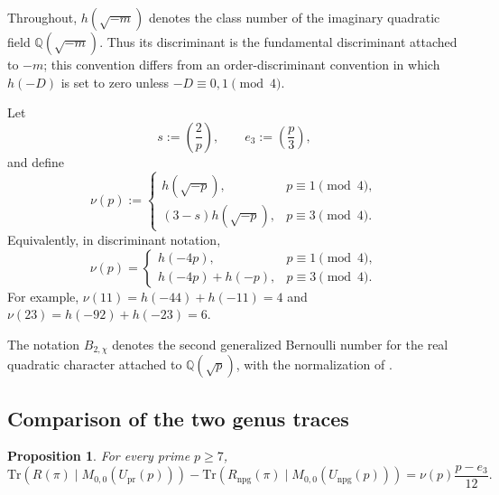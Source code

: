\documentclass[10pt,a4paper]{amsart}
\newtheorem{proposition}[theorem]{Proposition}
\newcommand{\Q}{\mathbb{Q}}
\newcommand{\Tr}{\mathrm{Tr}}
\newcommand{\Upr}{U_{\mathrm{pr}}}
\providecommand{\kro}[2]{\left(\frac{#1}{#2}\right)}
\providecommand{\Upr}{U_{\mathrm{pr}}}
\begin{document}
	Throughout, $h(\sqrt{-m})$ denotes the class number of the imaginary
	quadratic field $\Q(\sqrt{-m})$. Thus its discriminant is the fundamental
	discriminant attached to $-m$; this convention differs from an
	order-discriminant convention in which $h(-D)$ is set to zero unless
	$-D\equiv0,1\pmod4$.
	
	Let
	\[
	s:=\kro{2}{p},\qquad e_3:=\kro{p}{3},
	\]
	and define
	\begin{equation}\label{eq:nu-principal}
		\nu(p):=
		\begin{cases}
			h(\sqrt{-p}),&p\equiv1\pmod4,\\
			(3-s)h(\sqrt{-p}),&p\equiv3\pmod4.
		\end{cases}
	\end{equation}
	Equivalently, in discriminant notation,
	\[
	\nu(p)=
	\begin{cases}
		h(-4p),&p\equiv1\pmod4,\\
		h(-4p)+h(-p),&p\equiv3\pmod4.
	\end{cases}
	\]
	For example, $\nu(11)=h(-44)+h(-11)=4$ and
	$\nu(23)=h(-92)+h(-23)=6$.
	
	The notation $B_{2,\chi}$ denotes the second generalized Bernoulli number
	for the real quadratic character attached to $\Q(\sqrt p)$, with the
	normalization of \cite{IbukiyamaKatsura,Ibukiyama2019quinary}.
	
	\subsection{Comparison of the two genus traces}
	\label{ss:trace-comparison}
	
	\begin{proposition}
		\label{prop:genus-trace-comparison}
		For every prime $p\ge7$,
		\begin{equation}\label{eq:genus-trace-difference}
			\Tr\!\left(R(\pi)\mid M_{0,0}(\Upr(p))\right)
			-
			\Tr\!\left(R_{\mathrm{npg}}(\pi)\mid M_{0,0}(U_{\mathrm{npg}}(p))\right)
			=
			\nu(p)\frac{p-e_3}{12}.
		\end{equation}
	\end{proposition}
	
\end{document}
